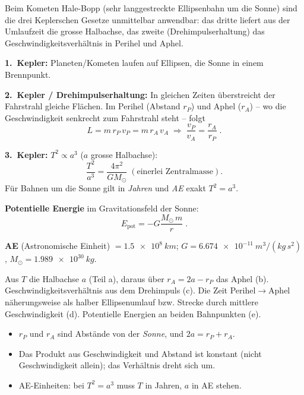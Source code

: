 
Beim Kometen Hale-Bopp (sehr langgestreckte Ellipsenbahn um die Sonne) sind
die drei Keplerschen Gesetze unmittelbar anwendbar: das dritte liefert aus der
Umlaufzeit die grosse Halbachse, das zweite (Drehimpulserhaltung) das
Geschwindigkeitsverhältnis in Perihel und Aphel.

\begin{werkzeugkasten}[Werkzeuge]
\textbf{1.\ Kepler:} Planeten/Kometen laufen auf Ellipsen, die Sonne in einem
Brennpunkt.

\textbf{2.\ Kepler / Drehimpulserhaltung:} In gleichen Zeiten überstreicht der
Fahrstrahl gleiche Flächen. Im Perihel (Abstand $r_P$) und Aphel ($r_A$)
-- wo die Geschwindigkeit senkrecht zum Fahrstrahl steht -- folgt
\begin{equation}
  L = m\, r_P\, v_P = m\, r_A\, v_A
  \;\Rightarrow\;
  \frac{v_P}{v_A} = \frac{r_A}{r_P}\;.
\end{equation}

\textbf{3.\ Kepler:} $T^2 \propto a^3$ ($a$ grosse Halbachse):
\begin{equation}
  \frac{T^2}{a^3} = \frac{4\pi^2}{G M_\odot}
  \;(\text{einerlei Zentralmasse}).
\end{equation}
Für Bahnen um die Sonne gilt in \emph{Jahren} und \emph{AE} exakt $T^2=a^3$.

\textbf{Potentielle Energie} im Gravitationsfeld der Sonne:
\begin{equation}
  E_\mathrm{pot} = -G\frac{M_\odot\, m}{r}\;.
\end{equation}

\textbf{AE} (Astronomische Einheit) $=\qty{1.5e8}{km}$; $G=\qty{6.674e-11}{m^3/(kg\,s^2)}$,
$M_\odot=\qty{1.989e30}{kg}$.
\end{werkzeugkasten}

\begin{werkzeugkasten}
Aus $T$ die Halbachse $a$ (Teil a), daraus über $r_A = 2a-r_P$ das Aphel (b).
Geschwindigkeitsverhältnis aus dem Drehimpuls (c). Die Zeit Perihel$\to$Aphel
näherungsweise als halber Ellipsenumlauf bzw. Strecke durch mittlere
Geschwindigkeit (d). Potentielle Energien an beiden Bahnpunkten (e).
\end{werkzeugkasten}

\begin{achtung}
\begin{itemize}
  \item $r_P$ und $r_A$ sind Abstände von der \emph{Sonne}, und
       $2a=r_P+r_A$.
  \item Das Produkt aus Geschwindigkeit und Abstand ist konstant (nicht Geschwindigkeit
       allein); das Verhältnis dreht sich um.
  \item AE-Einheiten: bei $T^2=a^3$ muss $T$ in Jahren, $a$ in AE stehen.
\end{itemize}
\end{achtung}
